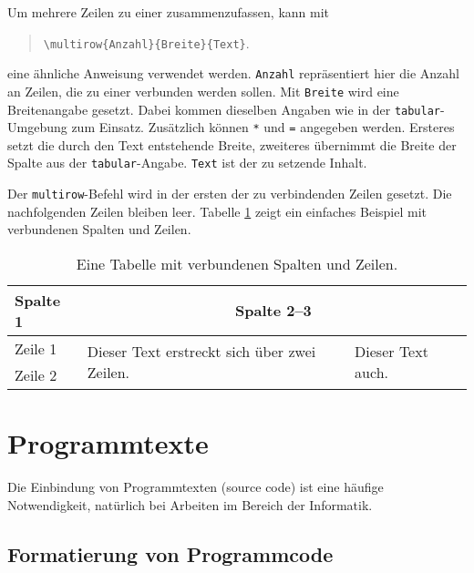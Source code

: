 Um mehrere Zeilen zu einer zusammenzufassen, kann mit
%
\begin{quote}
	\verb!\multirow{Anzahl}{Breite}{Text}!.
\end{quote}
%
eine ähnliche Anweisung verwendet werden. \texttt{Anzahl} repräsentiert hier
die Anzahl an Zeilen, die zu einer verbunden werden sollen. Mit
\texttt{Breite} wird eine Breitenangabe gesetzt. Dabei kommen dieselben
Angaben wie in der \texttt{tabular}-Umgebung zum Einsatz. Zusätzlich können
\texttt{*} und \texttt{=} angegeben werden. Ersteres setzt die durch den Text
entstehende Breite, zweiteres übernimmt die Breite der Spalte aus der
\texttt{tabular}-Angabe. \texttt{Text} ist der zu setzende Inhalt.

Der \verb|multirow|-Befehl wird in der ersten der zu verbindenden Zeilen
gesetzt. Die nachfolgenden Zeilen bleiben leer. Tabelle
\ref{tab:multi-column-row-tabelle} zeigt ein einfaches Beispiel mit
verbundenen Spalten und Zeilen.

\begin{table}
	\caption{Eine Tabelle mit verbundenen Spalten und Zeilen.}
	\label{tab:multi-column-row-tabelle}
	\centering
	\setlength{\tabcolsep}{10pt} %
	\def\arraystretch{1.25}      %
	\begin{tabular}{@{}lll@{}}
		\toprule
		Spalte 1 & \multicolumn{2}{c}{Spalte 2--3} \\
		\midrule
		Zeile 1  & 
		\multirow{2}{4cm}{Dieser Text erstreckt sich über zwei Zeilen.} &
		\multirow{2}{*}{Dieser Text auch.} \\
	    Zeile 2  & & \\
		\bottomrule
	\end{tabular}
\end{table}


\section{Programmtexte}
\label{sec:programmtexte}

Die Einbindung von Programmtexten (source code) ist eine häufige Notwendigkeit,
\va natürlich bei Arbeiten im Bereich der Informatik.


\subsection{Formatierung von Programmcode}
\label{sec:FormatierungVonProgrammcode}

